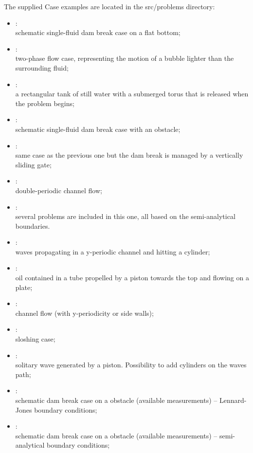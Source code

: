 \documentclass{../GPUSPHtemplate}
\begin{document}
The supplied Case examples are located in the src/problems directory:\\
\begin{itemize}
\item	{}:\\
schematic single-fluid dam break case on a flat bottom;
\item	{}:\\
two-phase flow case, representing the motion of a bubble lighter
than the surrounding fluid;
\item	{}:\\
a rectangular tank of still water with a submerged torus 
that is released when the problem begins;
\item	{}:\\
schematic single-fluid dam break case with an obstacle;
\item	{}:\\
same case as the previous one but the dam break is managed by a
vertically sliding gate;
\item	{}:\\
double-periodic channel flow;
\item	{}:\\
several problems are included in this one, all based on the semi-analytical boundaries.
\item	{}:\\
waves propagating in a y-periodic channel and hitting a cylinder;
\item	{}:\\
oil contained in a tube propelled by a piston towards the top and flowing on a plate;
\item	{}:\\
channel flow (with y-periodicity or side walls);
\item	{}:\\
sloshing case;
\item	{}:\\
solitary wave generated by a piston. Possibility to add cylinders on the waves path;
\item	{}:\\
schematic dam break case on a obstacle (available measurements) -- Lennard-Jones boundary conditions;
\item	{}:\\
schematic dam break case on a obstacle (available measurements) -- semi-analytical boundary conditions;

\end{itemize}
\end{document}
